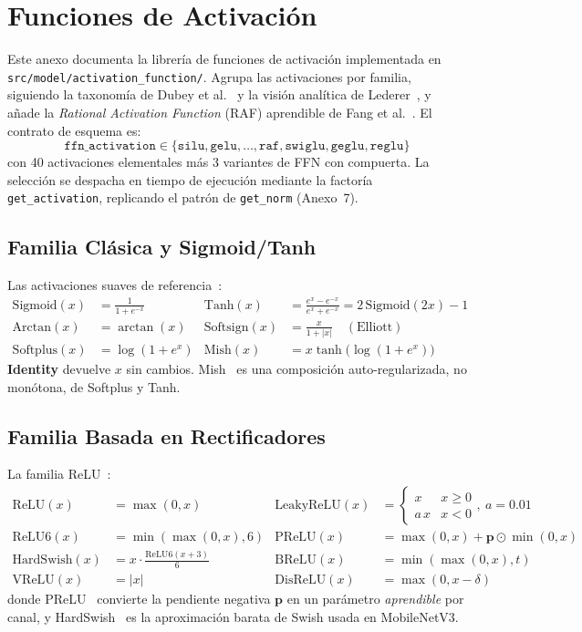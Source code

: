 \section{Funciones de Activación}
\label{sec:annex-funciones-activacion}

Este anexo documenta la librería de funciones de activación implementada en
\texttt{src/model/activation\_function/}. Agrupa las activaciones por familia,
siguiendo la taxonomía de Dubey et al.~\citep{dubey2021activations} y la visión
analítica de Lederer~\citep{lederer2021activations}, y añade la
\emph{Rational Activation Function} (RAF) aprendible de Fang et
al.~\citep{fang2023raft}. El contrato de esquema es:
\[
\texttt{ffn\_activation} \in \{\texttt{silu}, \texttt{gelu}, \dots, \texttt{raf}, \texttt{swiglu}, \texttt{geglu}, \texttt{reglu}\}
\]
con 40 activaciones elementales más 3 variantes de FFN con compuerta. La
selección se despacha en tiempo de ejecución mediante la factoría
\texttt{get\_activation}, replicando el patrón de \texttt{get\_norm} (Anexo~7).

\subsection{Familia Clásica y Sigmoid/Tanh}

Las activaciones suaves de referencia~\citep{lederer2021activations,dubey2021activations}:
\begin{align*}
\text{Sigmoid}(x) &= \frac{1}{1+e^{-x}} & \text{Tanh}(x) &= \frac{e^{x}-e^{-x}}{e^{x}+e^{-x}} = 2\,\text{Sigmoid}(2x)-1 \\
\text{Arctan}(x) &= \arctan(x) & \text{Softsign}(x) &= \frac{x}{1+|x|} \quad (\text{Elliott}) \\
\text{Softplus}(x) &= \log(1+e^{x}) & \text{Mish}(x) &= x\tanh\!\big(\log(1+e^{x})\big)
\end{align*}
\textbf{Identity} devuelve $x$ sin cambios. Mish~\citep{misra2019mish} es una
composición auto-regularizada, no monótona, de Softplus y Tanh.

\subsection{Familia Basada en Rectificadores}

La familia ReLU~\citep{nair2010relu,dubey2021activations}:
\begin{align*}
\text{ReLU}(x) &= \max(0,x) & \text{LeakyReLU}(x) &= \begin{cases} x & x\ge0 \\ a\,x & x<0 \end{cases},\ a=0.01 \\
\text{ReLU6}(x) &= \min(\max(0,x),6) & \text{PReLU}(x) &= \max(0,x)+\mathbf{p}\odot\min(0,x) \\
\text{HardSwish}(x) &= x\cdot\frac{\text{ReLU6}(x+3)}{6} & \text{BReLU}(x) &= \min(\max(0,x),t) \\
\text{VReLU}(x) &= |x| & \text{DisReLU}(x) &= \max(0,x-\delta)
\end{align*}
donde PReLU~\citep{he2015prelu} convierte la pendiente negativa $\mathbf{p}$ en
un parámetro \emph{aprendible} por canal, y HardSwish~\citep{howard2019hardswish}
es la aproximación barata de Swish usada en MobileNetV3.

